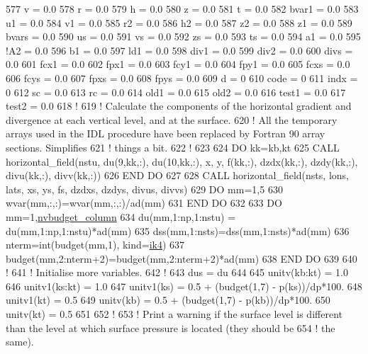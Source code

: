 \begin{DoxyCode}
577 v       = 0.0
578 r       = 0.0
579 h       = 0.0
580 z       = 0.0
581 t       = 0.0
582 bvar1   = 0.0
583 u1      = 0.0
584 v1      = 0.0
585 r2      = 0.0
586 h2      = 0.0
587 z2      = 0.0
588 z1      = 0.0
589 bvars   = 0.0
590 us      = 0.0
591 vs      = 0.0
592 zs      = 0.0
593 ts      = 0.0
594 a1      = 0.0
595 \textcolor{comment}{!A2      = 0.0}
596 b1      = 0.0
597 ld1     = 0.0
598 div1    = 0.0
599 div2    = 0.0
600 divs    = 0.0
601 fcx1    = 0.0
602 fpx1    = 0.0
603 fcy1    = 0.0
604 fpy1    = 0.0
605 fcxs    = 0.0
606 fcys    = 0.0
607 fpxs    = 0.0
608 fpys    = 0.0
609 d       = 0
610 code    = 0
611 indx    = 0
612 sc      = 0.0
613 rc      = 0.0
614 old1    = 0.0
615 old2    = 0.0
616 test1 = 0.0
617 test2 = 0.0
618 \textcolor{comment}{!}
619 \textcolor{comment}{! Calculate the components of the horizontal gradient and divergence at each vertical level, and at the
       surface.}
620 \textcolor{comment}{! All the temporary arrays used in the IDL procedure have been replaced by Fortran 90 array sections.
       Simplifies}
621 \textcolor{comment}{! things a bit.}
622 \textcolor{comment}{!}
623 
624 \textcolor{keywordflow}{DO} kk=kb,kt
625     \textcolor{keyword}{CALL }horizontal\_field(nstu, du(9,kk,:), du(10,kk,:), x, y, f(kk,:), dzdx(kk,:), dzdy(kk,:), divu(kk,:),
       divv(kk,:))
626 \textcolor{keywordflow}{END DO}
627 
628 \textcolor{keyword}{CALL }horizontal\_field(nsts, lons, lats, xs, ys, fs, dzdxs, dzdys, divus, divvs)
629 \textcolor{keywordflow}{DO} mm=1,5
630     wvar(mm,:,:)=wvar(mm,:,:)/ad(mm)
631 \textcolor{keywordflow}{END DO}
632 
633 \textcolor{keywordflow}{DO} mm=1,\hyperlink{namespacesettings_a78876a80ce867f4bc71866b783b6de89}{nvbudget\_column}
634     du(mm,1:np,1:nstu) = du(mm,1:np,1:nstu)*ad(mm)
635     dss(mm,1:nsts)=dss(mm,1:nsts)*ad(mm)
636     nterm=int(budget(mm,1), kind=\hyperlink{namespaceportable_aa110cf333432508140602ea192c4b2ea}{ik4})
637     budget(mm,2:nterm+2)=budget(mm,2:nterm+2)*ad(mm)
638 \textcolor{keywordflow}{END DO}
639 
640 \textcolor{comment}{!}
641 \textcolor{comment}{! Initialise more variables.}
642 \textcolor{comment}{!}
643 dus             = du
644 
645 unitv(kb:kt)    = 1.0
646 unitv1(ks:kt)   = 1.0
647 unitv1(ks)      = 0.5 + (budget(1,7) - p(ks))/dp*100.
648 unitv1(kt)      = 0.5
649 unitv(kb)       = 0.5 + (budget(1,7) - p(kb))/dp*100.
650 unitv(kt)       = 0.5
651 
652 \textcolor{comment}{!}
653 \textcolor{comment}{! Print a warning if the surface level is different than the level at which surface pressure is located
       (they should be}
654 \textcolor{comment}{! the same).}

\end{DoxyCode}
